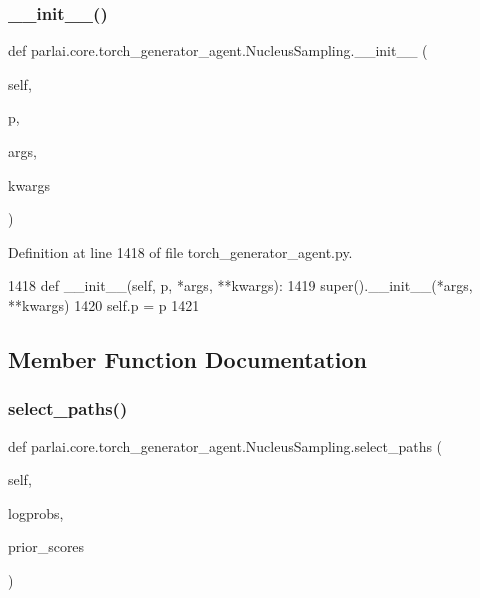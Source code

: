 \subsubsection{\texorpdfstring{\+\_\+\+\_\+init\+\_\+\+\_\+()}{\_\_init\_\_()}}
{\footnotesize\ttfamily def parlai.\+core.\+torch\+\_\+generator\+\_\+agent.\+Nucleus\+Sampling.\+\_\+\+\_\+init\+\_\+\+\_\+ (\begin{DoxyParamCaption}\item[{}]{self,  }\item[{}]{p,  }\item[{}]{args,  }\item[{}]{kwargs }\end{DoxyParamCaption})}



Definition at line 1418 of file torch\+\_\+generator\+\_\+agent.\+py.


\begin{DoxyCode}
1418     \textcolor{keyword}{def }\_\_init\_\_(self, p, *args, **kwargs):
1419         super().\_\_init\_\_(*args, **kwargs)
1420         self.p = p
1421 
\end{DoxyCode}


\subsection{Member Function Documentation}
\mbox{\label{classparlai_1_1core_1_1torch__generator__agent_1_1NucleusSampling_a91abde2fb2dccf5cd0564825ddc5ea4d}} 
\subsubsection{\texorpdfstring{select\+\_\+paths()}{select\_paths()}}
{\footnotesize\ttfamily def parlai.\+core.\+torch\+\_\+generator\+\_\+agent.\+Nucleus\+Sampling.\+select\+\_\+paths (\begin{DoxyParamCaption}\item[{}]{self,  }\item[{}]{logprobs,  }\item[{}]{prior\+\_\+scores }\end{DoxyParamCaption})}




